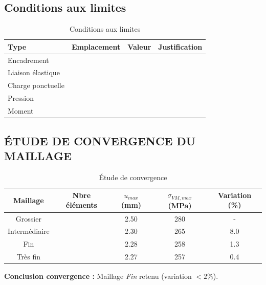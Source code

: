 \documentclass[12pt,a4paper]{article}
\begin{document}
					\subsection{Conditions aux limites}
					\begin{table}[H]
						\centering
						\begin{tabular}{p{3cm}p{4cm}p{5cm}p{4cm}}
							\toprule
							\textbf{Type} & \textbf{Emplacement} & \textbf{Valeur} & \textbf{Justification} \\
							\midrule
							Encadrement & \dotfill & \dotfill & \dotfill \\
							Liaison élastique & \dotfill & \dotfill & \dotfill \\
							Charge ponctuelle & \dotfill & \dotfill & \dotfill \\
							Pression & \dotfill & \dotfill & \dotfill \\
							Moment & \dotfill & \dotfill & \dotfill \\
							\bottomrule
						\end{tabular}
						\caption{Conditions aux limites}
					\end{table}
			
			\subsection{ÉTUDE DE CONVERGENCE DU MAILLAGE}
			
					\begin{table}[H]
						\centering
						\begin{tabular}{ccccc}
							\toprule
							\textbf{Maillage} & \textbf{Nbre éléments} & \textbf{$u_{max}$ (mm)} & \textbf{$\sigma_{VM,max}$ (MPa)} & \textbf{Variation (\%)} \\
							\midrule
							Grossier & \dotfill & 2.50 & 280 & - \\
							Intermédiaire & \dotfill & 2.30 & 265 & 8.0 \\
							Fin & \dotfill & 2.28 & 258 & 1.3 \\
							Très fin & \dotfill & 2.27 & 257 & 0.4 \\
							\bottomrule
						\end{tabular}
						\caption{Étude de convergence}
					\end{table}
					
					\textbf{Conclusion convergence :} Maillage \textit{Fin} retenu (variation $< 2\%$).
			
			
			
			
			
\end{document}
